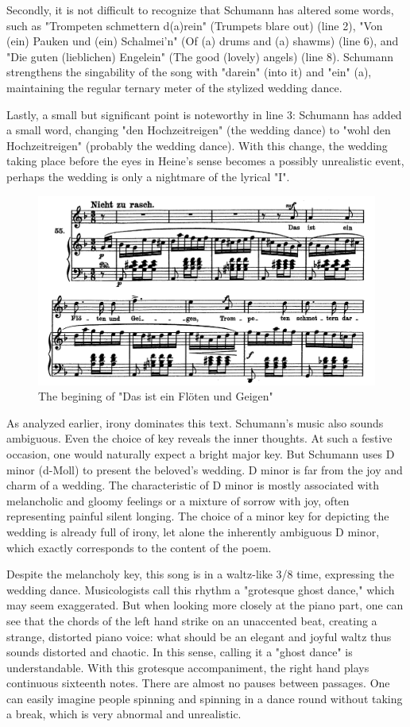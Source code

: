 \documentclass[10pt,a4paper,twocolumn]{rho}
\begin{document}
Secondly, it is not difficult to recognize that Schumann has altered some words, such as "Trompeten schmettern d(a)rein" (Trumpets blare out) (line 2), "Von (ein) Pauken und (ein) Schalmei’n" (Of (a) drums and (a) shawms) (line 6), and "Die guten (lieblichen) Engelein" (The good (lovely) angels) (line 8). Schumann strengthens the singability of the song with "darein" (into it) and "ein" (a), maintaining the regular ternary meter of the stylized wedding dance.

Lastly, a small but significant point is noteworthy in line 3: Schumann has added a small word, changing "den Hochzeitreigen" (the wedding dance) to "wohl den Hochzeitreigen" (probably the wedding dance). With this change, the wedding taking place before the eyes in Heine's sense becomes a possibly unrealistic event, perhaps the wedding is only a nightmare of the lyrical "I".

\begin{figure}[H]
    \centering
    \includegraphics[width=0.7\linewidth]{giigen.png}
    \caption{The begining of "Das ist ein Flöten und Geigen"}
    \label{fig:enter-label}
\end{figure}
As analyzed earlier, irony dominates this text. Schumann's music also sounds ambiguous. Even the choice of key reveals the inner thoughts. At such a festive occasion, one would naturally expect a bright major key. But Schumann uses D minor (d-Moll) to present the beloved's wedding. D minor is far from the joy and charm of a wedding. The characteristic of D minor is mostly associated with melancholic and gloomy feelings or a mixture of sorrow with joy, often representing painful silent longing. The choice of a minor key for depicting the wedding is already full of irony, let alone the inherently ambiguous D minor, which exactly corresponds to the content of the poem.

Despite the melancholy key, this song is in a waltz-like 3/8 time, expressing the wedding dance. Musicologists call this rhythm a "grotesque ghost dance," which may seem exaggerated. But when looking more closely at the piano part, one can see that the chords of the left hand strike on an unaccented beat, creating a strange, distorted piano voice: what should be an elegant and joyful waltz thus sounds distorted and chaotic. In this sense, calling it a "ghost dance" is understandable. With this grotesque accompaniment, the right hand plays continuous sixteenth notes. There are almost no pauses between passages. One can easily imagine people spinning and spinning in a dance round without taking a break, which is very abnormal and unrealistic.
\end{document}
